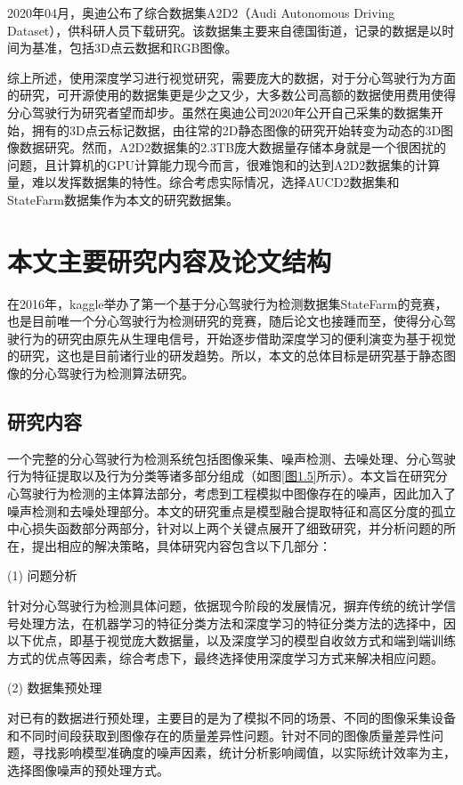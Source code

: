 2020年04月，奥迪公布了综合数据集A2D2（Audi Autonomous Driving Dataset）\cite{34}，供科研人员下载研究。该数据集主要来自德国街道，记录的数据是以时间为基准，包括3D点云数据和RGB图像。

综上所述，使用深度学习进行视觉研究，需要庞大的数据，对于分心驾驶行为方面的研究，可开源使用的数据集更是少之又少，大多数公司高额的数据使用费用使得分心驾驶行为研究者望而却步。虽然在奥迪公司2020年公开自己采集的数据集开始，拥有的3D点云标记数据，由往常的2D静态图像的研究开始转变为动态的3D图像数据研究。然而，A2D2数据集的2.3TB庞大数据量存储本身就是一个很困扰的问题，且计算机的GPU计算能力现今而言，很难饱和的达到A2D2数据集的计算量，难以发挥数据集的特性。综合考虑实际情况，选择AUCD2数据集和StateFarm数据集作为本文的研究数据集。

\section{本文主要研究内容及论文结构}

在2016年，kaggle举办了第一个基于分心驾驶行为检测数据集StateFarm的竞赛，也是目前唯一个分心驾驶行为检测研究的竞赛，随后论文也接踵而至，使得分心驾驶行为的研究由原先从生理电信号，开始逐步借助深度学习的便利演变为基于视觉的研究，这也是目前诸行业的研发趋势。所以，本文的总体目标是研究基于静态图像的分心驾驶行为检测算法研究。

\subsection{研究内容}

一个完整的分心驾驶行为检测系统包括图像采集、噪声检测、去噪处理、分心驾驶行为特征提取以及行为分类等诸多部分组成（如图\ref{图1.5}所示）。本文旨在研究分心驾驶行为检测的主体算法部分，考虑到工程模拟中图像存在的噪声，因此加入了噪声检测和去噪处理部分。本文的研究重点是模型融合提取特征和高区分度的孤立中心损失函数部分两部分，针对以上两个关键点展开了细致研究，并分析问题的所在，提出相应的解决策略，具体研究内容包含以下几部分：

(1)	问题分析

针对分心驾驶行为检测具体问题，依据现今阶段的发展情况，摒弃传统的统计学信号处理方法，在机器学习的特征分类方法和深度学习的特征分类方法的选择中，因以下优点，即基于视觉庞大数据量，以及深度学习的模型自收敛方式和端到端训练方式的优点等因素，综合考虑下，最终选择使用深度学习方式来解决相应问题。

(2)	数据集预处理

对已有的数据进行预处理，主要目的是为了模拟不同的场景、不同的图像采集设备和不同时间段获取到图像存在的质量差异性问题。针对不同的图像质量差异性问题，寻找影响模型准确度的噪声因素，统计分析影响阈值，以实际统计效率为主，选择图像噪声的预处理方式。

